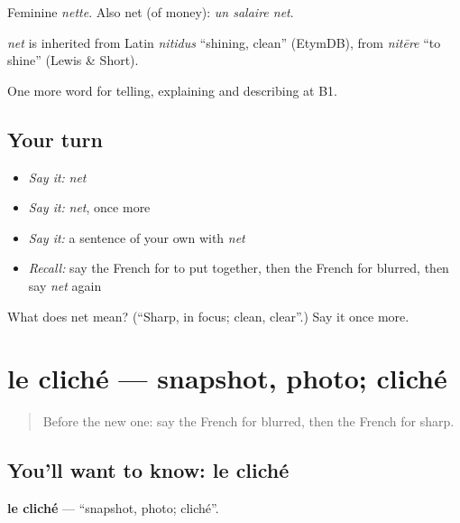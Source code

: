 Feminine \emph{nette}. Also net (of money): \emph{un salaire net}.

\begin{cousinweb}
\emph{net} is inherited from Latin \emph{nitidus} \textquotedblleft{}shining, clean\textquotedblright{} (EtymDB), from \emph{nitēre} \textquotedblleft{}to shine\textquotedblright{} (Lewis \& Short).
\end{cousinweb}

\begin{grammarlens}[title={What you've built}]
One more word for telling, explaining and describing at B1.
\end{grammarlens}

\subsection*{Your turn}
\begin{itemize}
\raggedright
  \item \emph{Say it:} \emph{net}
  \item \emph{Say it:} \emph{net}, once more
  \item \emph{Say it:} a sentence of your own with \emph{net}
  \item \emph{Recall:} say the French for to put together, then the French for blurred, then say \emph{net} again
\end{itemize}

\begin{tcolorbox}[breakable,colback=teal!4,colframe=teal!35!black,title={Before you move on}]
What does net mean? (\textquotedblleft{}Sharp, in focus; clean, clear\textquotedblright{}.) Say it once more.
\end{tcolorbox}
\section[le cliché]{le cliché — snapshot, photo; cliché}

\label{lesson:FR-C502-cliche}



\begin{quote}
Before the new one: say the French for blurred, then the French for sharp.
\end{quote}

\subsection*{You'll want to know: le cliché}
\textbf{le cliché} — \textquotedblleft{}snapshot, photo; cliché\textquotedblright{}.

